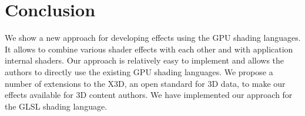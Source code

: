 \documentclass{egpubl}
\begin{document}
\section{Conclusion}

We show a new approach for developing effects using the GPU shading languages.
It allows to combine various shader effects with each other
and with application internal shaders.
Our approach is relatively easy
to implement and allows the authors to directly use the existing GPU shading
languages.
We propose a number of extensions to the X3D,
an open standard for 3D data, to make our effects available for 3D
content authors. We have implemented our approach for the GLSL shading language.





\end{document}
